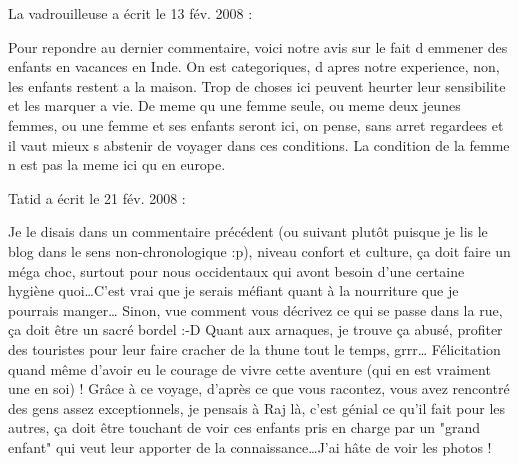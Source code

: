 \medskip
La vadrouilleuse a écrit le 13 fév. 2008 :
\begin{displayquote}
Pour repondre au dernier commentaire, voici notre avis sur le fait d emmener des enfants en vacances en Inde. On est categoriques, d apres notre experience, non, les enfants restent a la maison. Trop de choses ici peuvent heurter leur sensibilite et les marquer a vie.
De meme qu une femme seule, ou meme deux jeunes femmes, ou une femme et ses enfants seront ici, on pense, sans arret regardees et il vaut mieux s abstenir de voyager dans ces conditions. La condition de la femme n est pas la meme ici qu en europe.
\end{displayquote}

\medskip
Tatid a écrit le 21 fév. 2008 :
\begin{displayquote}
Je le disais dans un commentaire précédent (ou suivant plutôt puisque je lis le blog dans le sens non-chronologique :p), niveau confort et culture, ça doit faire un méga choc, surtout pour nous occidentaux qui avont besoin d'une certaine hygiène quoi\dots C'est vrai que je serais méfiant quant à la nourriture que je pourrais manger\dots
Sinon, vue comment vous décrivez ce qui se passe dans la rue, ça doit être un sacré bordel :-D Quant aux arnaques, je trouve ça abusé, profiter des touristes pour leur faire cracher de la thune tout le temps, grrr\dots
Félicitation quand même d'avoir eu le courage de vivre cette aventure (qui en est vraiment une en soi) !
Grâce à ce voyage, d'après ce que vous racontez, vous avez rencontré des gens assez exceptionnels, je pensais à Raj là, c'est génial ce qu'il fait pour les autres, ça doit être touchant de voir ces enfants pris en charge par un "grand enfant" qui veut leur apporter de la connaissance\dots J'ai hâte de voir les photos !
\end{displayquote}

\vfill
